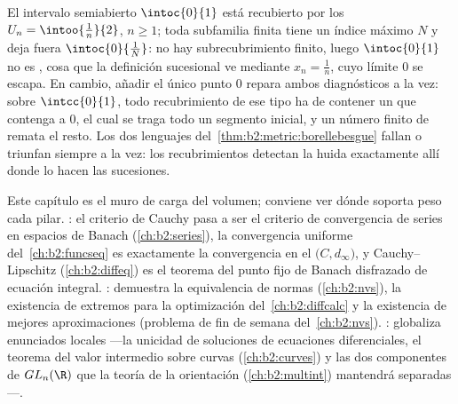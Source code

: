 \begin{example}\label{ex:b2:metric:covers}
El intervalo semiabierto $\intoc{0}{1}$ está recubierto por los
 $U_n = \intoo{\frac1n}{2}$, $n \geq 1$; toda subfamilia
finita tiene un índice máximo $N$ y deja fuera $\intoc{0}{\frac1N}$:
no hay subrecubrimiento finito, luego $\intoc{0}{1}$ no es
, cosa que la definición sucesional ve mediante $x_n =
\frac1n$, cuyo límite $0$ se escapa. En cambio, añadir el único
punto $0$ repara ambos diagnósticos a la vez: sobre $\intcc{0}{1}$,
todo recubrimiento de ese tipo ha de contener un  que
contenga a $0$, el cual se traga todo un segmento inicial, y un
número finito de  remata el resto. Los dos lenguajes del~\cref{thm:b2:metric:borellebesgue} fallan o triunfan siempre a la
vez: los recubrimientos detectan la huida exactamente allí donde lo
hacen las sucesiones.
\end{example}

\begin{remark}\label{rem:b2:metric:perspectives}
Este capítulo es el muro de carga del volumen; conviene ver dónde
soporta peso cada pilar. \emph{}: el criterio de Cauchy
pasa a ser el criterio de convergencia de series en espacios de
Banach (\cref{ch:b2:series}), la convergencia uniforme del~\cref{ch:b2:funcseq} es exactamente la convergencia en el
 $\bigl(C, d_\infty\bigr)$, y Cauchy--Lipschitz
(\cref{ch:b2:diffeq}) es el teorema del punto fijo de Banach
disfrazado de ecuación integral. \emph{}: demuestra la
equivalencia de normas (\cref{ch:b2:nvs}), la existencia de extremos
para la optimización del~\cref{ch:b2:diffcalc} y la existencia de
mejores aproximaciones (problema de fin de semana del~\cref{ch:b2:nvs}). \emph{}: globaliza enunciados locales
---la unicidad de soluciones de ecuaciones diferenciales, el teorema
del valor intermedio sobre curvas (\cref{ch:b2:curves}) y las dos
componentes de $GL_n(\R)$ que la teoría de la orientación
(\cref{ch:b2:multint}) mantendrá separadas---.
\end{remark}

